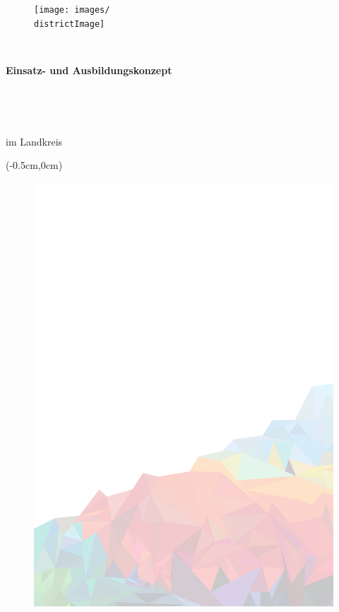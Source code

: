 \thispagestyle{plain}

\begin{figure}
  \centering
  \texttt{[image: images/\\districtImage]} 
\end{figure}
\,
\vspace{5\baselineskip}

\begin{center}
\begin{huge}\textbf{Einsatz- und Ausbildungskonzept}\end{huge}\\ 
\vspace{0.5\baselineskip}
\begin{huge}\textbf{\flq \specialistGroup{}\frq{}}\end{huge}\\
\vspace{1\baselineskip}
\begin{Large}im Landkreis \district\end{Large}
\vspace{3\baselineskip}
\end{center}

\begin{textblock*}{5cm}(-0.5cm,0cm) %
   \begin{figure}[]
		\includegraphics[width=22cm]{images/PageCover.pdf}
	\end{figure}
\end{textblock*}

\newpage
